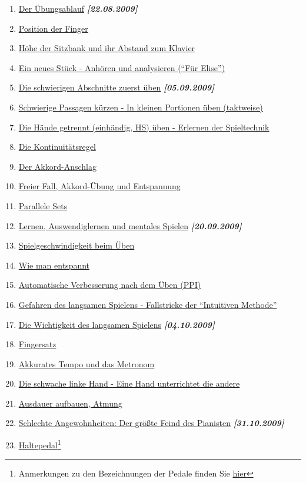 \begin{enumerate} 
 \item \hyperlink{c1ii1}{Der Übungsablauf} \textbf{\textit{[22.08.2009]}}
 \item \hyperlink{c1ii2}{Position der Finger}
 \item \hyperlink{c1ii3}{Höhe der Sitzbank und ihr Abstand zum Klavier}
 \item \hyperlink{c1ii4}{Ein neues Stück - Anhören und analysieren (\enquote{Für Elise})}
 \item \hyperlink{c1ii5}{Die schwierigen Abschnitte zuerst üben}  \textbf{\textit{[05.09.2009]}}
 \item \hyperlink{c1ii6}{Schwierige Passagen kürzen - In kleinen Portionen üben (taktweise)}
 \item \hyperlink{c1ii7}{Die Hände getrennt (einhändig, HS) üben - Erlernen der Spieltechnik}
 \item \hyperlink{c1ii8}{Die Kontinuitätsregel}
 \item \hyperlink{c1ii9}{Der Akkord-Anschlag}
 \item \hyperlink{c1ii10}{Freier Fall, Akkord-Übung und Entspannung}
 \item \hyperlink{c1ii11}{Parallele Sets}
 \item \hyperlink{c1ii12}{Lernen, Auswendiglernen und mentales Spielen} \textbf{\textit{[20.09.2009]}}
 \item \hyperlink{c1ii13}{Spielgeschwindigkeit beim Üben}
 \item \hyperlink{c1ii14}{Wie man entspannt}
 \item \hyperlink{c1ii15}{Automatische Verbesserung nach dem Üben (PPI)}
 \item \hyperlink{c1ii16}{Gefahren des langsamen Spielens - Fallstricke der \enquote{Intuitiven Methode}}
 \item \hyperlink{c1ii17}{Die Wichtigkeit des langsamen Spielens} \textbf{\textit{[04.10.2009]}}

 \item \hyperlink{c1ii18}{Fingersatz}
 \item \hyperlink{c1ii19}{Akkurates Tempo und das Metronom}
 \item \hyperlink{c1ii20}{Die schwache linke Hand - Eine Hand unterrichtet die andere}
 \item \hyperlink{c1ii21}{Ausdauer aufbauen, Atmung}

 \item \hyperlink{c1ii22}{Schlechte Angewohnheiten: Der größte Feind des Pianisten} \textbf{\textit{[31.10.2009]}}
 \item \hyperlink{c1ii23}{Haltepedal}\footnote{Anmerkungen zu den Bezeichnungen der Pedale finden Sie \hyperlink{Pedale}{hier}}
 

\end{enumerate}
